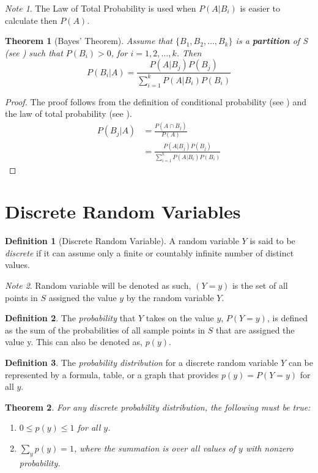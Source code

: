 \documentclass{article}
\theoremstyle{plain}
\newtheorem{thm}{Theorem}[section]
\theoremstyle{definition}
\newtheorem{defn}{Definition}[section]
\theoremstyle{remark}
\newtheorem*{note}{Note}
\begin{document}
\begin{note}
The Law of Total Probability is used when $P(A|B_i)$ is easier to calculate then $P(A)$.
\end{note}

\begin{thm}[Bayes' Theorem] 
Assume that $\{B_1,B_2,\ldots,B_k\}$ is a \textbf{partition} of S (see ) such that $P(B_i) > 0$, for $i = 1,2,\ldots,k$. Then
$$
P(B_i|A) = \frac{P(A|B_j)P(B_j)}{\displaystyle \sum_{i = 1}^k P(A|B_i)P(B_i)}
$$
\end{thm}
\begin{proof}
The proof follows from the definition of conditional probability (see ) and the law of total probability (see ).
\begin{align*}
P(B_j|A) &= \frac{P(A \cap B_j)}{P(A)}\\[5pt]
&= \frac{P(A|B_j)P(B_j)}{\displaystyle \sum_{i = 1}^k P(A|B_i)P(B_i)}
\end{align*}
\end{proof}

\section{Discrete Random Variables}
\begin{defn}[Discrete Random Variable]
A random variable $Y$ is said to be \textit{discrete} if it can assume only a finite or countably infinite number of distinct values.
\end{defn}

\begin{note}
Random variable will be denoted as such, $(Y = y)$ is the set of all points in $S$ assigned the value $y$ by the random variable $Y$.
\end{note}

\begin{defn}
The \textit{probability} that $Y$ takes on the value $y$, $P(Y = y)$, is defined as the sum of the probabilities of all sample points in $S$ that are assigned the value y. This can also be denoted as, $p(y)$.
\end{defn}

\begin{defn}
The \textit{probability distribution} for a discrete random variable $Y$ can be represented by a formula, table, or a graph that provides $p(y) = P(Y = y)$ for all $y$.
\end{defn}

\begin{thm}
For any discrete probability distribution, the following must be true:
\begin{enumerate}
\item $0 \leq p(y) \leq 1$ for all $y$.
\item $\sum_{y}p(y) = 1$, where the summation is over all values of $y$ with nonzero probability.
\end{enumerate}
\end{thm}
\end{document}
